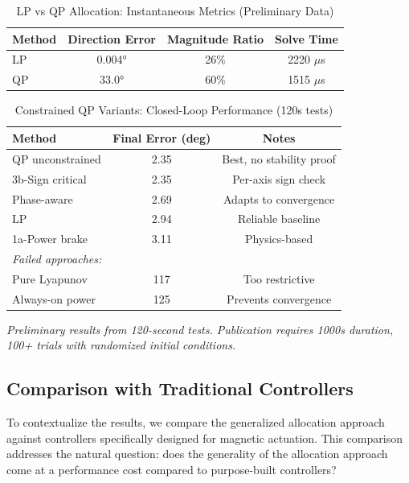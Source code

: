 \documentclass[conference]{IEEEtran}
\begin{document}
\begin{table}[h]
    \centering
    \caption{LP vs QP Allocation: Instantaneous Metrics (Preliminary Data)}
    \label{tab:lp_qp_instantaneous}
    \begin{tabular}{lccc}
        \toprule
        Method & Direction Error & Magnitude Ratio & Solve Time \\
        \midrule
        LP & 0.004° & 26\% & 2220 $\mu$s \\
        QP & 33.0° & 60\% & 1515 $\mu$s \\
        \bottomrule
    \end{tabular}
\end{table}

\begin{table}[h]
    \centering
    \caption{Constrained QP Variants: Closed-Loop Performance (120s tests)}
    \label{tab:constrained_qp}
    \begin{tabular}{lcc}
        \toprule
        Method & Final Error (deg) & Notes \\
        \midrule
        QP unconstrained & 2.35 & Best, no stability proof \\
        3b-Sign critical & 2.35 & Per-axis sign check \\
        Phase-aware & 2.69 & Adapts to convergence \\
        LP & 2.94 & Reliable baseline \\
        1a-Power brake & 3.11 & Physics-based \\
        \midrule
        \textit{Failed approaches:} & & \\
        Pure Lyapunov & 117 & Too restrictive \\
        Always-on power & 125 & Prevents convergence \\
        \bottomrule
    \end{tabular}
\end{table}

\emph{Preliminary results from 120-second tests. Publication requires 1000s duration, 100+ trials with randomized initial conditions.}

\subsection{Comparison with Traditional Controllers}
To contextualize the results, we compare the generalized allocation approach against controllers specifically designed for magnetic actuation. This comparison addresses the natural question: does the generality of the allocation approach come at a performance cost compared to purpose-built controllers?
\end{document}
